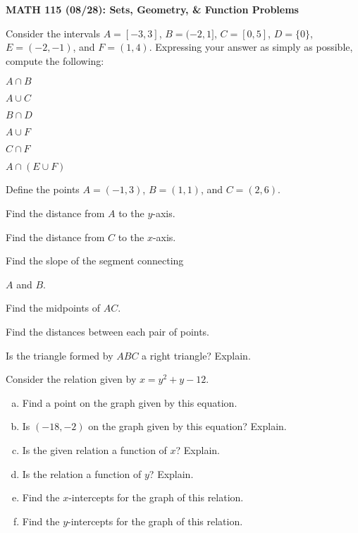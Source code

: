 \documentclass[11pt,letterpaper]{article}
\begin{document}
\begin{center} {\bfseries \Large MATH 115 (08/28): Sets, Geometry, \& Function Problems} \end{center} \par\vspace{1cm}

\prob Consider the intervals $A= [-3, 3]$, $B= (-2, 1]$, $C= [0, 5]$, $D= \{ 0 \}$, $E= (-2, -1)$, and $F= (1, 4)$. Expressing your answer as simply as possible, compute the following:
	\begin{2enumerate}
	\item $A \cap B$
	\item $A \cup C$
	\item $B \cap D$
	\item $A \cup F$
	\item $C \cap F$
	\item $A \cap (E \cup F)$
	\end{2enumerate} \pspace



\prob Define the points $A= (-1, 3)$, $B= (1, 1)$, and $C= (2, 6)$. 
	\begin{2enumerate}
	\item Find the distance from $A$ to the $y$-axis.
	\item Find the distance from $C$ to the $x$-axis.
	\item Find the slope of the segment connecting \par $A$ and $B$.
	\item Find the midpoints of $AC$.
	\item Find the distances between each pair of points.
	\item Is the triangle formed by $ABC$ a right triangle? Explain. 
	\end{2enumerate} \pspace



\prob Consider the relation given by $x= y^2 + y - 12$.
	\begin{enumerate}[(a)]
	\item Find a point on the graph given by this equation. 
	\item Is $(-18, -2)$ on the graph given by this equation? Explain.
	\item Is the given relation a function of $x$? Explain. 
	\item Is the relation a function of $y$? Explain. 
	\item Find the $x$-intercepts for the graph of this relation. 
	\item Find the $y$-intercepts for the graph of this relation. 
	\end{enumerate} \pspace
\end{document}
